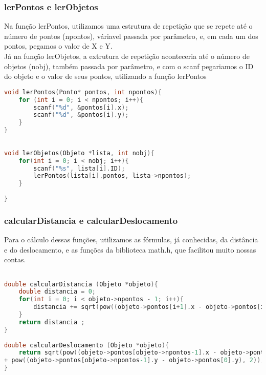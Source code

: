 \documentclass{article}
\begin{document}
\subsubsection{lerPontos e lerObjetos}

Na função lerPontos, utilizamos uma estrutura de repetição que se repete até o número de pontos (npontos), váriavel passada por parâmetro, e, em cada um dos pontos, pegamos o valor de X e Y.
\\Já na função lerObjetos, a extrutura de repetição aconteceria até o número de objetos (nobj), também passada por parâmetro, e com o scanf pegariamos o ID do objeto e o valor de seus pontos, utilizando a função lerPontos

\begin{lstlisting}[caption={Funções lerPontos e lerObjetos},label={lst:cod5},language=C]
void lerPontos(Ponto* pontos, int npontos){
    for (int i = 0; i < npontos; i++){
        scanf("%d", &pontos[i].x);
        scanf("%d", &pontos[i].y);
    }
}
    
    
void lerObjetos(Objeto *lista, int nobj){
    for(int i = 0; i < nobj; i++){
        scanf("%s", lista[i].ID);
        lerPontos(lista[i].pontos, lista->npontos);
    }
        
}

\end{lstlisting}

\subsubsection{calcularDistancia e calcularDeslocamento}

Para o cálculo dessas funções, utilizamos as fórmulas, já conhecidas, da distância e do deslocamento, e as funções da biblioteca math.h, que facilitou muito nossas contas.

\begin{lstlisting}[caption={Funções calcularDistancia e calcularDeslocamento},label={lst:cod6},language=C]

double calcularDistancia (Objeto *objeto){
    double distancia = 0;
    for(int i = 0; i < objeto->npontos - 1; i++){
        distancia += sqrt(pow((objeto->pontos[i+1].x - objeto->pontos[i].x), 2) + pow((objeto->pontos[i+1].y - objeto->pontos[i].y), 2));
    }
    return distancia ;
}
    
double calcularDeslocamento (Objeto *objeto){
    return sqrt(pow((objeto->pontos[objeto->npontos-1].x - objeto->pontos[0].x), 2) 
+ pow((objeto->pontos[objeto->npontos-1].y - objeto->pontos[0].y), 2));
}

\end{lstlisting}
\end{document}
